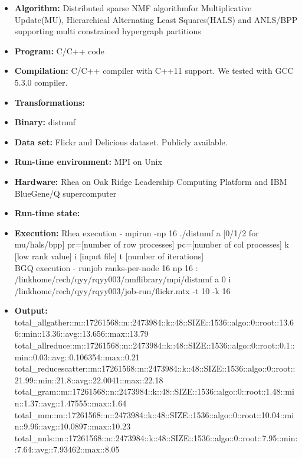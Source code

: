 \documentclass[sigconf, review=false]{acmart}
\newcommand{\distspnmffull}{Distributed sparse NMF algorithm}
\begin{document}
{\small
\begin{itemize}
  \item {\bf Algorithm: } \distspnmffull for Multiplicative Update(MU), Hierarchical Alternating Least Squares(HALS) and ANLS/BPP supporting multi constrained hypergraph partitions 
  \item {\bf Program: } C/C++ code
  \item {\bf Compilation: } C/C++ compiler with C++11 support. We tested with GCC 5.3.0 compiler. 
  \item {\bf Transformations: }
  \item {\bf Binary: } distnmf
  \item {\bf Data set: } Flickr and Delicious dataset. Publicly available. 
  \item {\bf Run-time environment: } MPI on Unix
  \item {\bf Hardware: } Rhea on Oak Ridge Leadership Computing Platform and IBM BlueGene/Q supercomputer
  \item {\bf Run-time state: } 
  \item {\bf Execution: } Rhea execution - mpirun -np 16 ./distnmf \-a [0/1/2 for mu/hals/bpp] \-\-pr=[number of row processes] \-\-pc=[number of col processes] \-k [low rank value] \-i [input file] \-t [number of iterations] \\
BGQ execution -  runjob \-\-ranks-per-node 16 \-\-np 16 : /linkhome/rech/qyy/rqyy003/nmflibrary/mpi/distnmf \-a 0 \-i /linkhome/rech/qyy/rqyy003/job-run/flickr.mtx -t 10 -k 16 \\
  \item {\bf Output: }
total\_allgather::m::17261568::n::2473984::k::48::SIZE::1536::algo::0::root::13.66::min::13.36::avg::13.656::max::13.79 \\
total\_allreduce::m::17261568::n::2473984::k::48::SIZE::1536::algo::0::root::0.1::min::0.03::avg::0.106354::max::0.21 \\
total\_reducescatter::m::17261568::n::2473984::k::48::SIZE::1536::algo::0::root::21.99::min::21.8::avg::22.0041::max::22.18 \\
total\_gram::m::17261568::n::2473984::k::48::SIZE::1536::algo::0::root::1.48::min::1.37::avg::1.47555::max::1.64 \\
total\_mm::m::17261568::n::2473984::k::48::SIZE::1536::algo::0::root::10.04::min::9.96::avg::10.0897::max::10.23 \\
total\_nnls::m::17261568::n::2473984::k::48::SIZE::1536::algo::0::root::7.95::min::7.64::avg::7.93462::max::8.05 \\

\end{itemize}}
\end{document}
